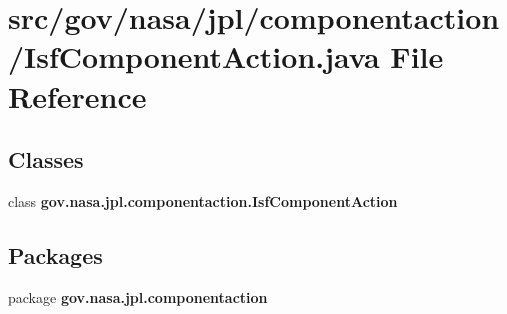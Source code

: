\section{src/gov/nasa/jpl/componentaction/\+Isf\+Component\+Action.java File Reference}
\label{_isf_component_action_8java}
\subsection*{Classes}
\begin{DoxyCompactItemize}
\item 
class {\bf gov.\+nasa.\+jpl.\+componentaction.\+Isf\+Component\+Action}
\end{DoxyCompactItemize}
\subsection*{Packages}
\begin{DoxyCompactItemize}
\item 
package {\bf gov.\+nasa.\+jpl.\+componentaction}
\end{DoxyCompactItemize}
